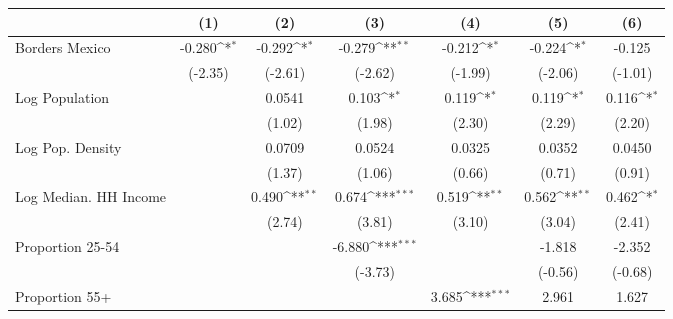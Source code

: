 {
\def\sym#1{\ifmmode^{#1}\else\(^{#1}\)\fi}
\begin{tabular}{l*{6}{c}}
\toprule
                    &\multicolumn{1}{c}{(1)}         &\multicolumn{1}{c}{(2)}         &\multicolumn{1}{c}{(3)}         &\multicolumn{1}{c}{(4)}         &\multicolumn{1}{c}{(5)}         &\multicolumn{1}{c}{(6)}         \\
\midrule
Borders Mexico      &      -0.280\sym{*}  &      -0.292\sym{*}  &      -0.279\sym{**} &      -0.212\sym{*}  &      -0.224\sym{*}  &      -0.125         \\
                    &     (-2.35)         &     (-2.61)         &     (-2.62)         &     (-1.99)         &     (-2.06)         &     (-1.01)         \\
\addlinespace
Log Population      &                     &      0.0541         &       0.103\sym{*}  &       0.119\sym{*}  &       0.119\sym{*}  &       0.116\sym{*}  \\
                    &                     &      (1.02)         &      (1.98)         &      (2.30)         &      (2.29)         &      (2.20)         \\
\addlinespace
Log Pop. Density    &                     &      0.0709         &      0.0524         &      0.0325         &      0.0352         &      0.0450         \\
                    &                     &      (1.37)         &      (1.06)         &      (0.66)         &      (0.71)         &      (0.91)         \\
\addlinespace
Log Median. HH Income&                     &       0.490\sym{**} &       0.674\sym{***}&       0.519\sym{**} &       0.562\sym{**} &       0.462\sym{*}  \\
                    &                     &      (2.74)         &      (3.81)         &      (3.10)         &      (3.04)         &      (2.41)         \\
\addlinespace
Proportion 25-54    &                     &                     &      -6.880\sym{***}&                     &      -1.818         &      -2.352         \\
                    &                     &                     &     (-3.73)         &                     &     (-0.56)         &     (-0.68)         \\
\addlinespace
Proportion 55+      &                     &                     &                     &       3.685\sym{***}&       2.961         &       1.627         \\

\end{tabular}}
